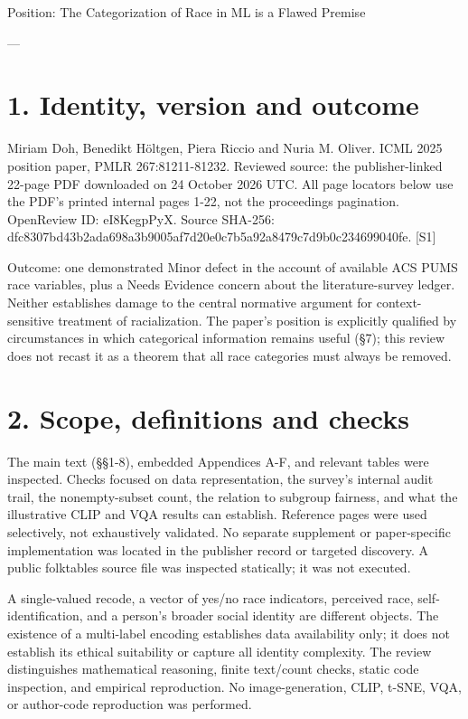 \documentclass[10pt]{article}
\begin{document}
Position: The Categorization of Race in ML is a Flawed Premise\par
---\par
\section*{1. Identity, version and outcome}
Miriam Doh, Benedikt Höltgen, Piera Riccio and Nuria M. Oliver. ICML 2025 position paper, PMLR 267:81211-81232. Reviewed source: the publisher-linked 22-page PDF downloaded on 24 October 2026 UTC. All page locators below use the PDF’s printed internal pages 1-22, not the proceedings pagination. OpenReview ID: eI8KegpPyX. Source SHA-256: dfc8307bd43b2ada698a3b9005af7d20e0c7b5a92a8479c7d9b0c234699040fe. [S1]\par
Outcome: one demonstrated Minor defect in the account of available ACS PUMS race variables, plus a Needs Evidence concern about the literature-survey ledger. Neither establishes damage to the central normative argument for context-sensitive treatment of racialization. The paper’s position is explicitly qualified by circumstances in which categorical information remains useful (§7); this review does not recast it as a theorem that all race categories must always be removed.\par
\section*{2. Scope, definitions and checks}
The main text (§§1-8), embedded Appendices A-F, and relevant tables were inspected. Checks focused on data representation, the survey’s internal audit trail, the nonempty-subset count, the relation to subgroup fairness, and what the illustrative CLIP and VQA results can establish. Reference pages were used selectively, not exhaustively validated. No separate supplement or paper-specific implementation was located in the publisher record or targeted discovery. A public folktables source file was inspected statically; it was not executed.\par
A single-valued recode, a vector of yes/no race indicators, perceived race, self-identification, and a person’s broader social identity are different objects. The existence of a multi-label encoding establishes data availability only; it does not establish its ethical suitability or capture all identity complexity. The review distinguishes mathematical reasoning, finite text/count checks, static code inspection, and empirical reproduction. No image-generation, CLIP, t-SNE, VQA, or author-code reproduction was performed.\par
\end{document}
